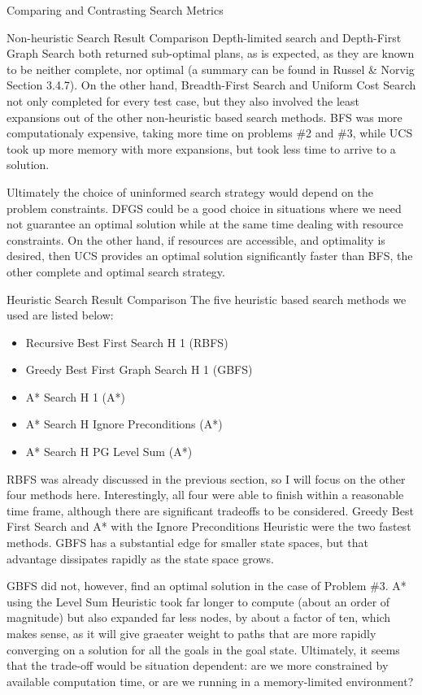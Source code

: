 \documentclass{article}
\begin{document}
\begin{section}{Comparing and Contrasting Search Metrics}
\begin{subsection}{Non-heuristic Search Result Comparison}
	Depth-limited search and Depth-First Graph Search both returned sub-optimal plans, as is expected, as they are known to be neither complete, nor optimal (a summary can be found in Russel \& Norvig Section 3.4.7). On the other hand, Breadth-First Search and Uniform Cost Search
	not only completed for every test case, but they also involved the least expansions out of the other non-heuristic based search methods. BFS was 
	more computationaly expensive, taking more time on problems \#2 and \#3, while UCS took up more memory with more expansions, but took less time to
	arrive to a solution. \par
	Ultimately the choice of uninformed search strategy would depend on the problem constraints. DFGS could be a good choice in situations where we need not guarantee an optimal solution while at the same time dealing with 
	resource constraints. On the other hand, if resources are accessible, and optimality is desired, then UCS provides an optimal solution significantly faster than BFS, 
	the other complete and optimal search strategy. 
\end{subsection}
\begin{subsection}{Heuristic Search Result Comparison}
	The five heuristic based search methods we used are listed below:
	\begin{itemize}
		\item Recursive Best First Search H 1 (RBFS)
		\item Greedy Best First Graph Search H 1 (GBFS)
		\item A* Search H 1 (A*)
		\item A* Search H Ignore Preconditions (A*)
		\item A* Search H PG Level Sum (A*)
	\end{itemize}
	RBFS was already discussed in the previous section, so I will focus on the other four methods here. Interestingly, all four were able to finish within 
	a reasonable time frame, although there are significant tradeoffs to be considered. Greedy Best First Search and A* with the Ignore Preconditions Heuristic
	were the two fastest methods. GBFS has a substantial edge for smaller state spaces, but that advantage dissipates rapidly as the state space grows.\par
	GBFS did not, however, find an optimal solution in the case of Problem \#3. A* using the Level Sum Heuristic took far longer to compute (about an order of
	magnitude) but also expanded far less nodes, by about a factor of ten, which makes sense, as it will give graeater weight to paths that are more rapidly converging
	on a solution for all the goals in the goal state. Ultimately, it seems that the trade-off would be situation dependent: are we more
	constrained by available computation time, or are we running in a memory-limited environment?\par


\end{subsection}
\end{section}
\end{document}
